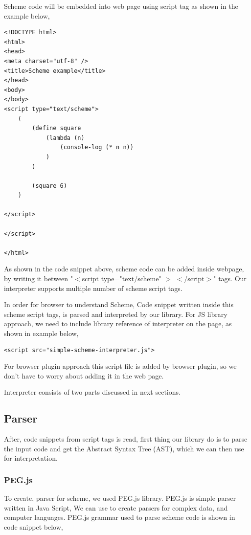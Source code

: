 Scheme code will be embedded into web page using script tag as shown in the example below, 

\begin{lstlisting}[frame=single]  
<!DOCTYPE html>
<html>
<head>
<meta charset="utf-8" />
<title>Scheme example</title>
</head>
<body>
</body>
<script type="text/scheme">
	(
		(define square
			(lambda (n) 
				(console-log (* n n)) 
			)
		)
		
		(square 6)
	)

</script>

</script>

</html>
\end{lstlisting}

As shown in the code snippet above, scheme code can be added inside webpage, by writing it between "$<$script type="text/scheme" $>$ $<$/script$>$" tags. Our interpreter supports multiple number of scheme script tags.

In order for browser to understand Scheme, Code snippet written inside this scheme script tags, is parsed and interpreted by our library. For JS library approach, we need to include library reference of interpreter on the page, as shown in example below, 

\begin{lstlisting}[frame=single]  
	<script src="simple-scheme-interpreter.js">
\end{lstlisting}

For browser plugin approach this script file is added by browser plugin, so we don't have to worry about adding it in the web page.

Interpreter consists of two parts discussed in next sections.

\subsection{Parser}

After, code snippets from script tags is read, first thing our library do is to parse the input code and get the Abstract Syntax Tree (AST), which we can then use for interpretation. 

\subsubsection{PEG.js}

To create, parser for scheme, we used PEG.js library. PEG.js is simple parser written in Java Script, We can use to create parsers for complex data, and computer languages. PEG.js grammar used to parse scheme code is shown in code snippet below,

